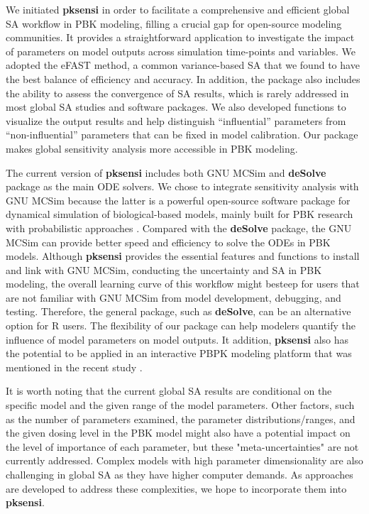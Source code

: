 \documentclass[preprint,12pt, a4paper]{elsarticle}
\begin{document}
We initiated \textbf{pksensi} in order to facilitate a comprehensive and efficient global SA workflow in PBK modeling, filling a crucial gap for open-source modeling communities. It provides a straightforward
application to investigate the impact of parameters on model outputs across simulation time-points and variables. We adopted the eFAST method, a common variance-based SA that we found to have the best
balance of efficiency and accuracy. In addition, the package also includes the ability to assess the convergence of SA results, which is rarely addressed in most global SA studies and software packages. We also developed functions to visualize the output results and help distinguish  ``influential'' parameters from ``non-influential'' parameters that can be fixed in model calibration. Our package makes global sensitivity analysis more accessible in PBK modeling.

The current version of \textbf{pksensi} includes both GNU MCSim and \textbf{deSolve} package as the main ODE solvers.  We chose to integrate sensitivity analysis with GNU MCSim because the latter is a powerful open-source software package for dynamical simulation of biological-based models, mainly built for PBK research with probabilistic approaches \cite{bois2009gnu}.  Compared with the \textbf{deSolve} package, the GNU MCSim can provide better speed and efficiency to solve the ODEs in PBK models. Although \textbf{pksensi} provides the essential features and functions to install and link with GNU MCSim, conducting the uncertainty and SA in PBK modeling, the overall learning curve of this workflow might besteep for users that are not familiar with GNU MCSim from model development, debugging, and testing. Therefore, the general package, such as \textbf{deSolve}, can be an alternative option for R users. The flexibility of our package can help modelers quantify the influence of model parameters on model outputs. It addition, \textbf{pksensi} also has the potential to be applied in an interactive PBPK modeling platform that was mentioned in the recent study \cite{li2019integration}.

It is worth noting that the current global SA results are conditional on the specific model and the given range of the model parameters. Other factors, such as the number of parameters examined, the parameter distributions/ranges, and the given dosing level in the PBK model might also have a potential impact on the level of importance of each parameter, but these "meta-uncertainties" are not currently addressed. Complex models with high parameter dimensionality are also challenging in global SA as they have higher computer demands. As approaches are developed to address these complexities, we hope to incorporate them into \textbf{pksensi}.
\end{document}
